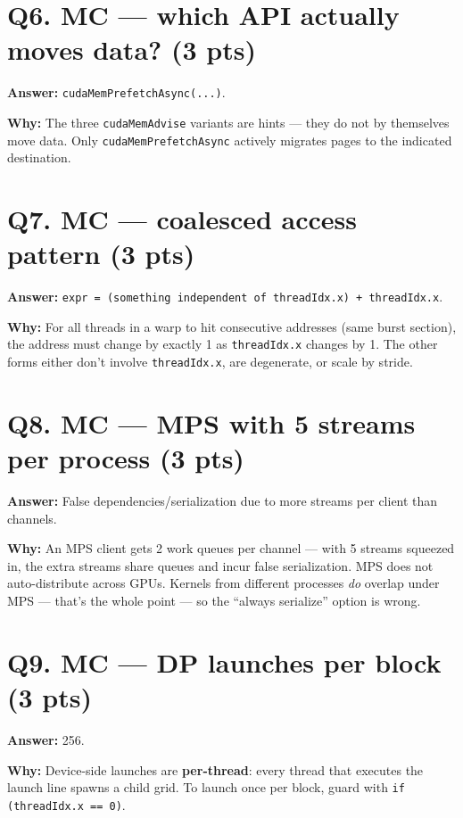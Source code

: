 \documentclass[11pt]{article}
\newcommand{\ans}[1]{\par\noindent\textcolor{anscolor}{\textbf{Answer:}} #1\par}
\newcommand{\why}[1]{\par\noindent\textcolor{anscolor}{\textbf{Why:}} #1\par\vspace{4pt}}
\begin{document}
\section*{Q6. MC --- which API actually moves data? (3 pts)}
\ans{\texttt{cudaMemPrefetchAsync(...)}.}
\why{The three \texttt{cudaMemAdvise} variants are hints — they do not by themselves move data.
Only \texttt{cudaMemPrefetchAsync} actively migrates pages to the indicated destination.}

\section*{Q7. MC --- coalesced access pattern (3 pts)}
\ans{\texttt{expr = (something independent of threadIdx.x) + threadIdx.x}.}
\why{For all threads in a warp to hit consecutive addresses (same burst section), the address
must change by exactly 1 as \texttt{threadIdx.x} changes by 1. The other forms either don't
involve \texttt{threadIdx.x}, are degenerate, or scale by stride.}

\section*{Q8. MC --- MPS with 5 streams per process (3 pts)}
\ans{False dependencies/serialization due to more streams per client than channels.}
\why{An MPS client gets 2 work queues per channel — with 5 streams squeezed in, the extra
streams share queues and incur false serialization. MPS does not auto-distribute across GPUs.
Kernels from different processes \emph{do} overlap under MPS — that's the whole point — so
the ``always serialize'' option is wrong.}

\section*{Q9. MC --- DP launches per block (3 pts)}
\ans{256.}
\why{Device-side launches are \textbf{per-thread}: every thread that executes the launch line
spawns a child grid. To launch once per block, guard with \texttt{if (threadIdx.x == 0)}.}
\end{document}
